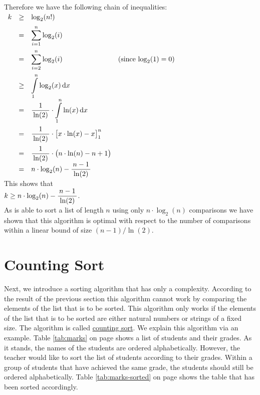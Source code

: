 Therefore we have the following chain of inequalities:
\\[0.2cm]
\hspace*{1.3cm}
$
\begin{array}[t]{lcll}
  k & \geq & \displaystyle\log_2(n!) \\[0.2cm]
    & =    & \displaystyle\sum\limits_{i=1}^n \log_2(i) \\[0.5cm]
    & =    & \displaystyle\sum\limits_{i=2}^n \log_2(i) & \mbox{(since $\log_2(1) = 0$)} \\[0.5cm]
    & \geq & \displaystyle\int\limits_{1}^n \log_2(x)\, \mathrm{d}x \\[0.2cm]
    & =    & \displaystyle\frac{1}{\,\ln(2)\,} \cdot \int\limits_{1}^n \ln(x)\, \mathrm{d}x  \\[0.6cm]
    & =    & \displaystyle\frac{1}{\,\ln(2)\,} \cdot \bigl[x \cdot \ln(x) - x \bigr]_{1}^n   \\[0.4cm]
    & =    & \displaystyle\frac{1}{\,\ln(2)\,} \cdot \bigl(n \cdot \ln(n) - n + 1\bigr)     \\[0.2cm]
    & =    & \displaystyle n \cdot \log_2(n) - \frac{\,n-1\,}{\,\ln(2)\,}                       
\end{array}
$ 
\\[0.2cm]
This shows that
\\[0.2cm]
\hspace*{1.3cm}
$k \geq n \cdot \displaystyle\log_2(n) - \frac{\,n-1\,}{\,\ln(2)\,}$.
\\[0.2cm]
As  is able to sort a list of length $n$ using only $n \cdot \log_2(n)$ comparisons
we have shown that this algorithm is optimal with respect to the number of comparisons within a linear bound of
size $(n-1)/\ln(2)$.




\section{Counting Sort}
Next, we introduce a sorting algorithm that has only a  complexity.
According to the result of the previous section this algorithm cannot work by comparing the elements of the
list that is to be sorted.  This algorithm only works if the elements of the list that is to be sorted are
either natural numbers or strings of a fixed size.  The algorithm is called
\href{https://en.wikipedia.org/wiki/Counting_sort}{counting sort}. We 
explain this algorithm via an example.  Table \ref{tab:marks} on page \pageref{tab:marks} shows a list of
students and their grades.  As it stands, the names of the students are ordered alphabetically.  However, the
teacher would like to sort the list of students according to their grades.  Within a group of students that
have achieved the same grade, the students should still be ordered alphabetically.  Table
\ref{tab:marks-sorted} on page \pageref{tab:marks-sorted} shows the table that has been sorted accordingly.

